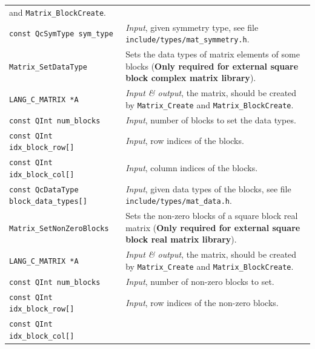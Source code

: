 \documentclass[a4paper,11pt,twoside,openright]{book}
\begin{document}
\begin{center}
\begin{longtable}{l|p{}}
        and \verb|Matrix_BlockCreate|.\\
    \hspace*{2ex}\verb|const QcSymType sym_type| %
      & \textsl{Input}, given symmetry type, see file \verb|include/types/mat_symmetry.h|.\\
    \hline
%
    \verb|Matrix_SetDataType|\index{\texttt{Matrix\_SetDataType}} %
      & Sets the data types of matrix elements of some blocks %
        (\textbf{Only required for external square block complex matrix library}).\\
    \hspace*{2ex}\verb|LANG_C_MATRIX *A| %
      & \textsl{Input \& output}, the matrix, should be created by \verb|Matrix_Create|
        and \verb|Matrix_BlockCreate|.\\
    \hspace*{2ex}\verb|const QInt num_blocks| %
      & \textsl{Input}, number of blocks to set the data types.\\
    \hspace*{2ex}\verb|const QInt idx_block_row[]| %
      & \textsl{Input}, row indices of the blocks.\\
    \hspace*{2ex}\verb|const QInt idx_block_col[]| %
      & \textsl{Input}, column indices of the blocks.\\
    \hspace*{2ex}\verb|const QcDataType block_data_types[]| %
      & \textsl{Input}, given data types of the blocks, see file
        \verb|include/types/mat_data.h|.\\
    \hline
%
    \verb|Matrix_SetNonZeroBlocks|\index{\texttt{Matrix\_SetNonZeroBlocks}} %
      & Sets the non-zero blocks of a square block real matrix %
        (\textbf{Only required for external square block real matrix library}).\\
    \hspace*{2ex}\verb|LANG_C_MATRIX *A| %
      & \textsl{Input \& output}, the matrix, should be created by \verb|Matrix_Create|
        and \verb|Matrix_BlockCreate|.\\
    \hspace*{2ex}\verb|const QInt num_blocks| %
      & \textsl{Input}, number of non-zero blocks to set.\\
    \hspace*{2ex}\verb|const QInt idx_block_row[]| %
      & \textsl{Input}, row indices of the non-zero blocks.\\
    \hspace*{2ex}\verb|const QInt idx_block_col[]| %

\end{longtable}
\end{center}
\end{document}
